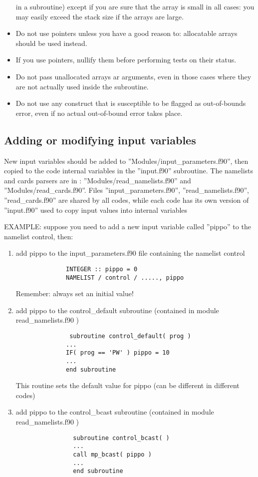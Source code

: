 \documentclass[12pt,a4paper]{article}
\begin{document}
\begin{itemize}
in a subroutine) except if you are sure that the array is small in all
cases: you may easily exceed the stack size if the arrays are large.
\item Do not use pointers unless you have a good reason to: 
allocatable arrays should be used instead.
\item If you use pointers, nullify them before performing tests on their
status.
\item Do not pass unallocated arrays ar arguments, even in those cases where
they are not actually used inside the subroutine.
\item Do not use any construct that is susceptible to be flagged as 
out-of-bounds error, even if no actual out-of-bound error takes place.
\end{itemize}

\subsection{Adding or modifying input variables}

New input variables should be added to 
''Modules/input\_parameters.f90'',
then copied to the code internal variables in the ''input.f90''
subroutine. The namelists and cards parsers are in :
''Modules/read\_namelists.f90'' and ''Modules/read\_cards.f90''.
Files ''input\_parameters.f90'', ''read\_namelists.f90'',
''read\_cards.f90'' are shared by all codes, while each code
has its own version of ''input.f90''  used to copy input values
into internal variables

EXAMPLE:
suppose you need to add a new input variable called ''pippo''
to the namelist control, then:

\begin{enumerate}
\item add pippo to the input\_parameters.f90 file containing the
namelist control 
\begin{verbatim}
              INTEGER :: pippo = 0
              NAMELIST / control / ....., pippo
\end{verbatim}
Remember: always set an initial value!

\item add pippo to the control\_default subroutine (contained in
module read\_namelists.f90 ) 
\begin{verbatim}
               subroutine control_default( prog )
              ...
              IF( prog == 'PW' ) pippo = 10
              ...
              end subroutine
\end{verbatim}
This routine sets the default value for pippo (can be different in
different codes) 

\item add pippo to the control\_bcast subroutine (contained in module
read\_namelists.f90 ) 
 \begin{verbatim}
                subroutine control_bcast( )
                ...
                call mp_bcast( pippo )
                ...
                end subroutine
\end{verbatim}
\end{enumerate}
 
\end{document}
